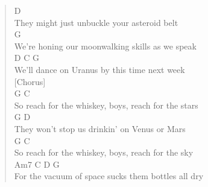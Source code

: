 \documentclass[11pt]{article}
\begin{document}
\begin{verse}
\hspace*{7em}D\\
They might just unbuckle your asteroid belt\\
\hspace*{8em}G\\
We're honing our moonwalking skills as we speak\\
\hspace*{7em}D                  C              G\\
We'll dance on Uranus by this time next week\\
\vspace*{1em}
[Chorus]\\
\hspace*{5em}G                                        C\\
So reach for the whiskey, boys, reach for the stars\\
\hspace*{6em}G                          D\\
They won't stop us drinkin' on Venus or Mars\\
\hspace*{5em}G                                          C\\
So reach for the whiskey, boys, reach for the sky\\
\hspace*{9em}Am7         C               D          G\\
For the vacuum of space sucks them bottles all dry\\
\end{verse}
\clearpage
\end{document}
